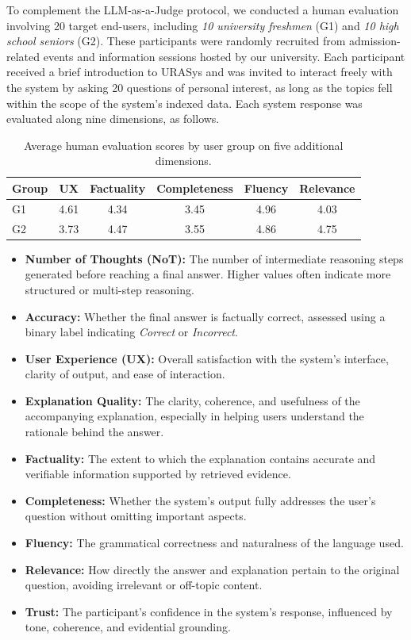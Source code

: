 \documentclass[11pt]{article}
\begin{document}
To complement the LLM-as-a-Judge protocol, we conducted a human evaluation involving 20 target end-users, including \textit{10 university freshmen} (G1) and \textit{10 high school seniors} (G2). These participants were randomly recruited from admission-related events and information sessions hosted by our university. Each participant received a brief introduction to URASys and was invited to interact freely with the system by asking 20 questions of personal interest, as long as the topics fell within the scope of the system’s indexed data. Each system response was evaluated along nine dimensions, as follows.


\begin{table}[!ht]
\centering
\caption{Average human evaluation scores by user group on five additional dimensions.}
\label{tab:human_group_results}
\begin{tabular}{l|ccccc}
\toprule
\textbf{Group} & \textbf{UX} & \textbf{Factuality} & \textbf{Completeness} & \textbf{Fluency} & \textbf{Relevance} \\
\midrule
G1 & 4.61 & 4.34 & 3.45 & 4.96 & 4.03 \\
G2   & 3.73 & 4.47 & 3.55 & 4.86 & 4.75 \\
\bottomrule
\end{tabular}
\end{table}



\begin{itemize}
    \item \textbf{Number of Thoughts (NoT):} The number of intermediate reasoning steps generated before reaching a final answer. Higher values often indicate more structured or multi-step reasoning.
    \item \textbf{Accuracy:} Whether the final answer is factually correct, assessed using a binary label indicating \textit{Correct} or \textit{Incorrect}.
    \item \textbf{User Experience (UX):} Overall satisfaction with the system’s interface, clarity of output, and ease of interaction.
    \item \textbf{Explanation Quality:} The clarity, coherence, and usefulness of the accompanying explanation, especially in helping users understand the rationale behind the answer.
    \item \textbf{Factuality:} The extent to which the explanation contains accurate and verifiable information supported by retrieved evidence.
    \item \textbf{Completeness:} Whether the system’s output fully addresses the user’s question without omitting important aspects.
    \item \textbf{Fluency:} The grammatical correctness and naturalness of the language used.
    \item \textbf{Relevance:} How directly the answer and explanation pertain to the original question, avoiding irrelevant or off-topic content.
    \item \textbf{Trust:} The participant’s confidence in the system’s response, influenced by tone, coherence, and evidential grounding.
\end{itemize}
\end{document}
